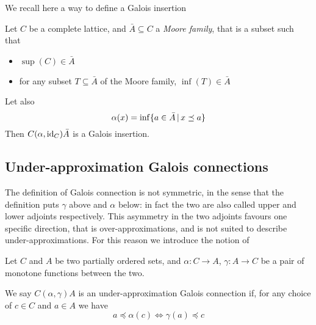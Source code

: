 We recall here a  way to define a Galois insertion
\begin{prop}\label{ch2:th:gi-moore-family}
	Let $C$ be a complete lattice, and $\bar{A} \subseteq C$ a \textit{Moore family}, that is a subset such that
	\begin{itemize}
		\item $\sup(C) \in \bar{A}$
		\item for any subset $T \subseteq \bar{A}$ of the Moore family, $\inf(T) \in \bar{A}$
	\end{itemize}
	Let also
	\[
	\alpha(x) = \inf\{ a \in \bar{A} \,\vert\, x \preceq a \}
	\]
	Then $C(\alpha, \text{id}_C) \bar{A}$ is a Galois insertion.
\end{prop}

\subsection{Under-approximation Galois connections}
%

The definition of Galois connection is not symmetric, in the sense that the definition puts $\gamma$ above and $\alpha$ below: in fact the two are also called upper and lower adjoints respectively. This asymmetry in the two adjoints favours one specific direction, that is over-approximations, and is not suited to describe under-approximations. For this reason we introduce the notion of
\begin{definition}\label{ch2:def:under-gc}
	Let $C$ and $A$ be two partially ordered sets, and $\alpha : C \rightarrow A$, $\gamma : A \rightarrow C$ be a pair of monotone functions between the two.
	
	We say $C (\alpha, \gamma) A$ is an under-approximation Galois connection if, for any choice of $c \in C$ and $a \in A$ we have
	\[
	a \preceq \alpha(c) \iff \gamma(a) \preceq c
	\]
\end{definition}

